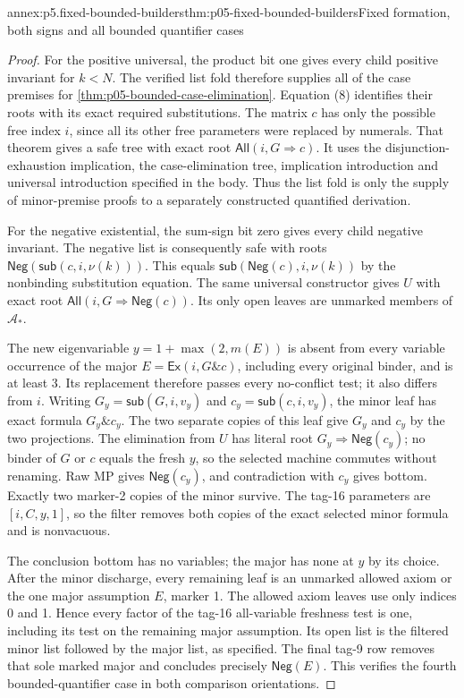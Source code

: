 \begin{annexitem}{annex:p5.fixed-bounded-builders}{thm:p05-fixed-bounded-builders}{Fixed formation, both signs and all bounded quantifier cases}
\begin{proof}
For the positive universal, the product bit one gives every child
positive invariant for \(k<N\). The verified list fold therefore
supplies all of the case premises for
\cref{thm:p05-bounded-case-elimination}. Equation (8) identifies their
roots with its exact required substitutions. The matrix \(c\) has
only the possible free index \(i\), since all its other free
parameters were replaced by numerals. That theorem gives a safe tree
with exact root \(\mathsf{All}(i,G\Rightarrow c)\). It uses
the disjunction-exhaustion implication, the case-elimination tree,
implication introduction and universal introduction specified in
the body. Thus the list fold is only the supply of minor-premise
proofs to a separately constructed quantified derivation.

For the negative existential, the sum-sign bit zero gives every child
negative invariant. The negative list is consequently safe with roots
\(\mathsf{Neg}(\mathsf{sub}(c,i,\nu(k)))\). This equals
\(\mathsf{sub}(\mathsf{Neg}(c),i,\nu(k))\) by the nonbinding
substitution equation. The same universal constructor gives \(U\)
with exact root \(\mathsf{All}(i,G\Rightarrow\mathsf{Neg}(c))\).
Its only open leaves are unmarked members of \(\mathcal A_*\).

The new eigenvariable \(y=1+\max(2,m(E))\) is absent from every
variable occurrence of the major \(E=\mathsf{Ex}(i,G\mathbin{\&}c)\),
including every original binder, and is at least 3. Its replacement
therefore passes every no-conflict test; it also differs from \(i\).
Writing \(G_y=\mathsf{sub}(G,i,v_y)\) and
\(c_y=\mathsf{sub}(c,i,v_y)\), the minor leaf has exact formula
\(G_y\mathbin{\&}c_y\). The two separate copies of this leaf
give \(G_y\) and \(c_y\) by the two projections. The elimination
from \(U\) has literal root \(G_y\Rightarrow\mathsf{Neg}(c_y)\);
no binder of \(G\) or \(c\) equals the fresh \(y\), so the
selected machine commutes without renaming. Raw MP gives
\(\mathsf{Neg}(c_y)\), and contradiction with \(c_y\) gives
bottom. Exactly two marker-2 copies of the minor survive. The tag-16
parameters are \([i,C,y,1]\), so the filter removes both copies of
the exact selected minor formula and is nonvacuous.

The conclusion bottom has no variables; the major has none at \(y\)
by its choice. After the minor discharge, every remaining leaf is an
unmarked allowed axiom or the one major assumption \(E\), marker 1.
The allowed axiom leaves use only indices 0 and 1. Hence every factor
of the tag-16 all-variable freshness test is one, including its test
on the remaining major assumption. Its open list is the filtered minor
list followed by the major list, as specified. The final tag-9 row
removes that sole marked major and concludes precisely
\(\mathsf{Neg}(E)\). This verifies the fourth bounded-quantifier
case in both comparison orientations.


\end{proof}
\end{annexitem}
